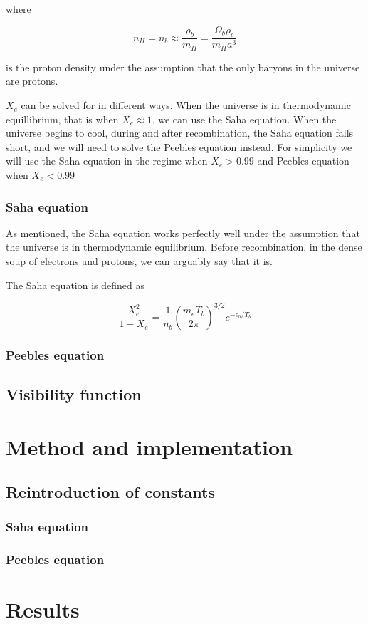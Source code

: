 \documentclass[12pt]{article}
\begin{document}
where 

\begin{equation}\label{eq: proton density}
    n_{H}=n_{b} \approx \frac{\rho_{b}}{m_{H}}=\frac{\Omega_{b} \rho_{c}}{m_{H} a^{3}}
\end{equation}

is the proton density under the assumption that the only baryons in the universe are protons. 

$X_e$ can be solved for in different ways. When the universe is in thermodynamic equillibrium, that is when $X_e \approx 1$, we can use the Saha equation. When the universe begins to cool, during and after recombination, the Saha equation falls short, and we will need to solve the Peebles equation instead. For simplicity we will use the Saha equation in the regime when $X_e > 0.99$ and Peebles equation when $X_e < 0.99$

\subsubsection{Saha equation}
As mentioned, the Saha equation works perfectly well under the assumption that the universe is in thermodynamic equilibrium. Before recombination, in the dense soup of electrons and protons, we can arguably say that it is. 

The Saha equation is defined as 

\begin{equation}\label{eq: saha equation}
    \frac{X_{e}^{2}}{1-X_{e}}=\frac{1}{n_{b}}\left(\frac{m_{e} T_{b}}{2 \pi}\right)^{3 / 2} e^{-\epsilon_{0} / T_{b}}
\end{equation}

\subsubsection{Peebles equation}
\subsection{Visibility function}

\section{Method and implementation}
\subsection{Reintroduction of constants}
\subsubsection{Saha equation}
\subsubsection{Peebles equation}


\section{Results}

{}

\end{document}
